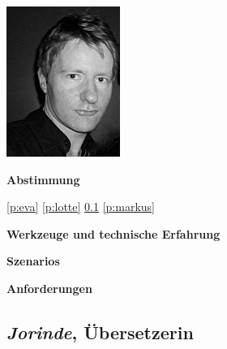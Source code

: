 \begin{multicols}{2}

\begin{center}
\includegraphics[width=0.5\columnwidth]{media/torsten.jpg}
\end{center}


\textbf{Abstimmung}

\ref{p:eva}
\ref{p:lotte}
\ref{p:jorinde}
\ref{p:markus}

\textbf{Werkzeuge und technische Erfahrung}

\columnbreak

\textbf{Szenarios}

\textbf{Anforderungen}

\end{multicols}

\pagebreak

\subsection{\emph{Jorinde}, Übersetzerin}\label{p:jorinde}

